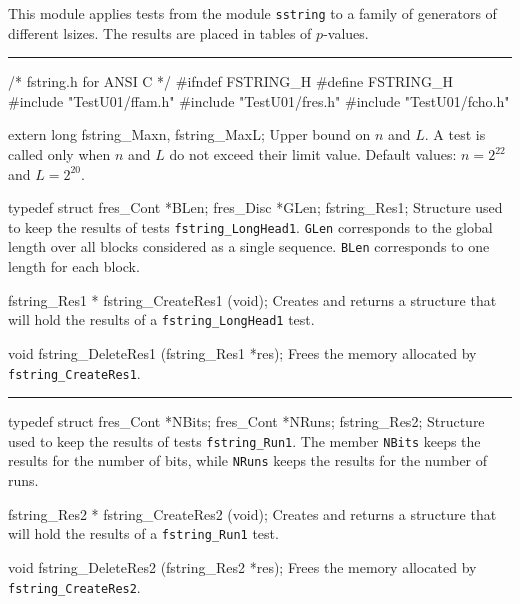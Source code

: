 
This module applies tests from the module {\tt sstring}
to a family of generators of different lsizes.
The results are placed in tables of $p$-values.

\bigskip
\hrule
\code\hide
/* fstring.h for ANSI C */
#ifndef FSTRING_H
#define FSTRING_H
\endhide
#include "TestU01/ffam.h"
#include "TestU01/fres.h"
#include "TestU01/fcho.h"


extern long fstring_Maxn, fstring_MaxL;
\endcode
\tab
  Upper bound on $n$ and $L$.
  A test is called only when $n$ and $L$ do not exceed their limit value.
  Default values: $n = 2^{22}$ and $L = 2^{20}$.
\endtab


\ifdetailed  %


\code

typedef struct {
   fres_Cont *BLen;
   fres_Disc *GLen;
} fstring_Res1;
\endcode
 \tab  Structure used to keep the results of tests
  {\tt fstring\_LongHead1}. {\tt GLen} corresponds to the global length
  over all blocks considered as a single sequence. {\tt BLen} corresponds
  to one length for each block. 
 \endtab
\code


fstring_Res1 * fstring_CreateRes1 (void);
\endcode
 \tab 
  Creates and returns a structure that will hold the results
  of a  {\tt fstring\_LongHead1} test. 
 \endtab
\code


void fstring_DeleteRes1 (fstring_Res1 *res);
\endcode
 \tab 
  Frees the memory allocated by {\tt fstring\_CreateRes1}.
 \endtab
\bigskip\hrule\bigskip
\code

typedef struct {
   fres_Cont *NBits;
   fres_Cont *NRuns;
} fstring_Res2;
\endcode
 \tab  Structure used to keep the results of tests {\tt fstring\_Run1}.
  The member {\tt NBits} keeps the results for the number of
   bits, while {\tt NRuns} keeps the results for the number of runs.
 \endtab
\code


fstring_Res2 * fstring_CreateRes2 (void);
\endcode
 \tab 
  Creates and returns a structure that will hold the results
  of a  {\tt fstring\_Run1} test. 
 \endtab
\code


void fstring_DeleteRes2 (fstring_Res2 *res);
\endcode
 \tab 
  Frees the memory allocated by {\tt fstring\_CreateRes2}.
 \endtab

\fi %




\code

